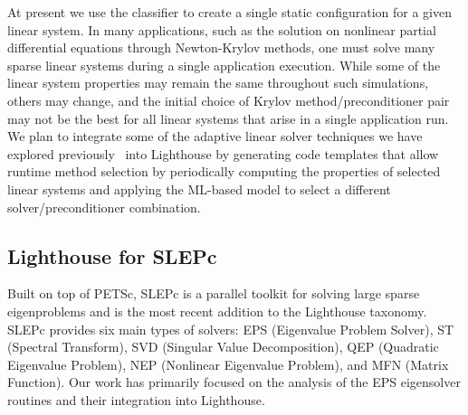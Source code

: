 \documentclass{sig-alternate}
\begin{document}
At present we use the classifier to create a single static configuration for a given linear system. In many applications, such as 
the solution on nonlinear partial differential equations through Newton-Krylov methods, one must solve many sparse linear systems during
a single application execution. While some of the linear system properties may remain the same throughout such simulations, others 
may change, and the initial choice of Krylov method/preconditioner pair may not be the best for all linear systems 
that arise in a single application run. We plan to integrate some of the adaptive linear solver techniques we have explored 
previously~\cite{Raghavan:2005:IPDPS,Bhowmick:2004:ASTC} 
into Lighthouse by generating code templates that allow runtime method 
selection by periodically computing the properties of selected linear systems and applying the ML-based model to select 
a different solver/preconditioner combination.



\subsection{Lighthouse for SLEPc}
Built on top of PETSc, SLEPc is a parallel toolkit for solving large sparse eigenproblems and is the most recent addition to the
Lighthouse taxonomy. SLEPc provides six main types of solvers: EPS (Eigenvalue Problem Solver), ST (Spectral Transform),
SVD (Singular Value Decomposition), QEP (Quadratic Eigenvalue Problem), NEP (Nonlinear Eigenvalue Problem), and MFN (Matrix Function).
Our work has primarily focused on the analysis of the EPS eigensolver routines and their integration into Lighthouse. 
\end{document}
